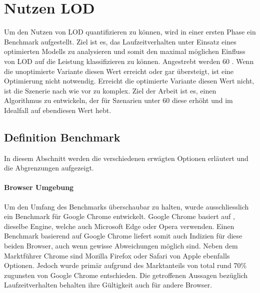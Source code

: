 \section{Nutzen LOD}
Um den Nutzen von LOD quantifizieren zu können, wird in einer ersten Phase ein Benchmark aufgestellt.
Ziel ist es, das Laufzeitverhalten unter Einsatz eines optimierten Modells zu analysieren und somit den maximal möglichen Einfluss von LOD auf die Leistung klassifizieren zu können.
Angestrebt werden 60 . Wenn die unoptimierte Variante diesen Wert erreicht oder gar übersteigt, ist eine Optimierung nicht notwendig. Erreicht die optimierte Variante diesen Wert nicht, ist die Szenerie nach wie vor zu komplex. Ziel der Arbeit ist es, einen Algorithmus zu entwickeln, der für Szenarien unter 60  diese erhöht und im Idealfall auf ebendiesen Wert hebt.

\subsection{Definition Benchmark}
In diesem Abschnitt werden die verschiedenen erwägten Optionen erläutert und die Abgrenzungen aufgezeigt.

\paragraph{Browser Umgebung}
Um den Umfang des Benchmarks überschaubar zu halten, wurde ausschliesslich ein Benchmark für Google Chrome entwickelt.
Google Chrome basiert auf , dieselbe Engine, welche auch Microsoft Edge oder Opera verwenden.
Einen Benchmark basierend auf Google Chrome liefert somit auch Indizien für diese beiden Browser, auch wenn gewisse Abweichungen möglich sind.
Neben dem Marktführer Chrome sind Mozilla Firefox oder Safari von Apple ebenfalls Optionen. Jedoch wurde primär aufgrund des Marktanteils von total rund 70\% \cite{browserUsage} zugunsten von Google Chrome entschieden.
Die getroffenen Aussagen bezüglich Laufzeitverhalten behalten ihre Gültigkeit auch für andere Browser.

